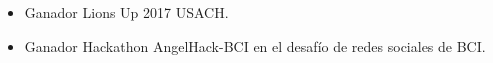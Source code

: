 
\begin{itemize}
    \item Ganador Lions Up 2017 USACH.
    \item Ganador Hackathon AngelHack-BCI en el desafío de redes sociales de BCI.
\end{itemize}







